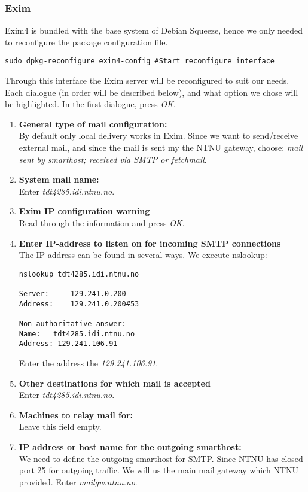 \subsubsection{Exim}
Exim4 is bundled with the base system of Debian Squeeze, hence we only
needed to reconfigure the package configuration file.
\begin{lstlisting}
sudo dpkg-reconfigure exim4-config #Start reconfigure interface
\end{lstlisting}
Through this interface the Exim server will be reconfigured to suit our
needs. Each dialogue (in order will be described below), and what option
we chose will be highlighted. In the first dialogue, press
\emph{OK}.
\begin{enumerate}
\item\textbf{General type of mail configuration:}\\
By default only local delivery works in Exim. Since we want to
send/receive external mail, and since the mail is sent my the NTNU
gateway, choose: \emph{mail sent by smarthost; received via SMTP or
fetchmail}.
\item\textbf{System mail name:}\\
Enter \emph{tdt4285.idi.ntnu.no}.
\item\textbf{Exim IP configuration warning}\\
Read through the information and press \emph{OK}.
\item\textbf{Enter IP-address to listen on for incoming SMTP
connections}\\
The IP address can be found in several ways. We execute nslookup:
\begin{lstlisting}
nslookup tdt4285.idi.ntnu.no

Server:		129.241.0.200
Address:	129.241.0.200#53

Non-authoritative answer:
Name:	tdt4285.idi.ntnu.no
Address: 129.241.106.91
\end{lstlisting}
Enter the address the \emph{129.241.106.91}.
\item\textbf{Other destinations for which mail is accepted}\\
Enter \emph{tdt4285.idi.ntnu.no}.
\item\textbf{Machines to relay mail for:}\\
Leave this field empty.
\item\textbf{IP address or host name for the outgoing smarthost:}\\
We need to define the outgoing smarthost for SMTP. Since NTNU has closed
port 25 for outgoing traffic. We will us the main mail gateway which
NTNU provided. Enter \emph{mailgw.ntnu.no}.
\end{enumerate}
